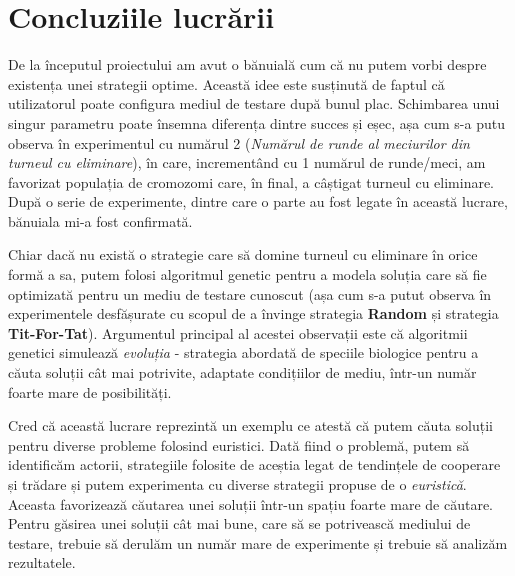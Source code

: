 \chapter*{Concluziile lucrării}

De la începutul proiectului am avut o bănuială cum că nu putem vorbi despre existența unei strategii optime. Această idee este susținută de faptul că utilizatorul poate configura mediul de testare după bunul plac. Schimbarea unui singur parametru poate însemna diferența dintre succes și eșec, așa cum s-a putu observa în experimentul cu numărul 2 (\textit{Numărul de runde al meciurilor din turneul cu eliminare}), în care, incrementând cu 1 numărul de runde/meci, am favorizat populația de cromozomi care, în final, a câștigat turneul cu eliminare. După o serie de experimente, dintre care o parte au fost legate în această lucrare, bănuiala mi-a fost confirmată.  
 
Chiar dacă nu există o strategie care să domine turneul cu eliminare în orice formă a sa, putem folosi algoritmul genetic pentru a modela soluția care să fie optimizată pentru un mediu de testare cunoscut (așa cum s-a putut observa în experimentele desfășurate cu scopul de a învinge strategia \textbf{Random} și strategia \textbf{Tit-For-Tat}). Argumentul principal al acestei observații este că algoritmii genetici simulează \textit{evoluția} - strategia abordată de speciile biologice pentru a căuta soluții cât mai potrivite, adaptate condițiilor de mediu, într-un număr foarte mare de posibilități.
  
Cred că această lucrare reprezintă un exemplu ce atestă că putem căuta soluții pentru diverse probleme folosind euristici. Dată fiind o problemă, putem să identificăm actorii, strategiile folosite de aceștia legat de tendințele de cooperare și trădare și putem experimenta cu diverse strategii propuse de o \textit{euristică}. Aceasta favorizează căutarea unei soluții într-un spațiu foarte mare de căutare. Pentru găsirea unei soluții cât mai bune, care să se potrivească mediului de testare, trebuie să derulăm un număr mare de experimente și trebuie să analizăm rezultatele. 

\clearpage